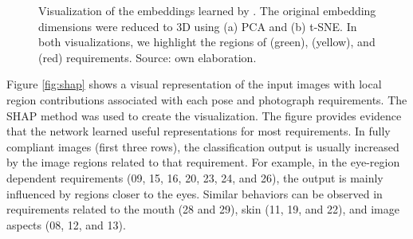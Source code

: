 \begin{figure}[htb]
\centering
{}
\caption{Visualization of the embeddings learned by \methodname. The original embedding dimensions were reduced to 3D using (a) PCA and (b) t-SNE. In both visualizations, we highlight the regions of \variedbackground (green), \unnaturalskintone (yellow), and \veiloverface (red) requirements. Source: own elaboration.}
\label{fig:embviz}
\end{figure}
 
Figure \ref{fig:shap} shows a visual representation of the input images with local region contributions associated with each pose and photograph requirements. The SHAP \citep{shap2018} method was used to create the visualization. The figure provides evidence that the network learned useful representations for most requirements. In fully compliant images (first three rows), the classification output is usually increased by the image regions related to that requirement. For example, in the eye-region dependent requirements (09, 15, 16, 20, 23, 24, and 26), the output is mainly influenced by regions closer to the eyes. Similar behaviors can be observed in requirements related to the mouth (28 and 29), skin (11, 19, and 22), and image aspects (08, 12, and 13). 
 
